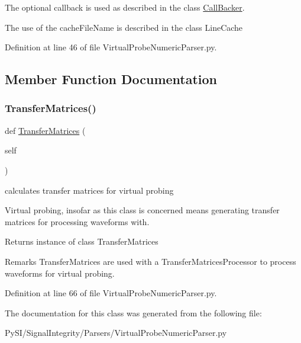 The optional callback is used as described in the class \hyperlink{namespaceSignalIntegrity_1_1CallBacker}{Call\+Backer}.

The use of the cache\+File\+Name is described in the class Line\+Cache 

Definition at line 46 of file Virtual\+Probe\+Numeric\+Parser.\+py.



\subsection{Member Function Documentation}
\mbox{\label{classSignalIntegrity_1_1Parsers_1_1VirtualProbeNumericParser_1_1VirtualProbeNumericParser_a836e87421e9e21a6676da06625b644b1}} 
\subsubsection{\texorpdfstring{Transfer\+Matrices()}{TransferMatrices()}}
{\footnotesize\ttfamily def \hyperlink{classSignalIntegrity_1_1FrequencyDomain_1_1TransferMatrices_1_1TransferMatrices}{Transfer\+Matrices} (\begin{DoxyParamCaption}\item[{}]{self }\end{DoxyParamCaption})}



calculates transfer matrices for virtual probing 

Virtual probing, insofar as this class is concerned means generating transfer matrices for processing waveforms with.

\begin{DoxyReturn}{Returns}
instance of class Transfer\+Matrices
\end{DoxyReturn}
\begin{DoxyRemark}{Remarks}
Transfer\+Matrices are used with a Transfer\+Matrices\+Processor to process waveforms for virtual probing. 
\end{DoxyRemark}


Definition at line 66 of file Virtual\+Probe\+Numeric\+Parser.\+py.



The documentation for this class was generated from the following file\+:\begin{DoxyCompactItemize}
\item 
Py\+S\+I/\+Signal\+Integrity/\+Parsers/Virtual\+Probe\+Numeric\+Parser.\+py\end{DoxyCompactItemize}

